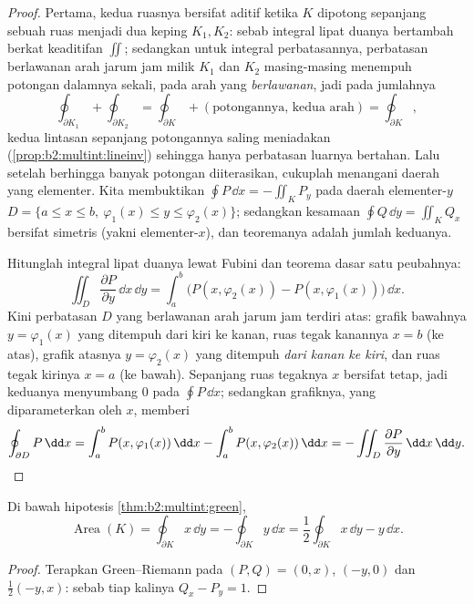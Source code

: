 \begin{proof}
Pertama, kedua ruasnya bersifat aditif ketika $K$ dipotong sepanjang sebuah
ruas menjadi dua keping $K_1, K_2$: sebab integral lipat duanya bertambah
berkat keaditifan $\iint$; sedangkan untuk integral perbatasannya,
perbatasan berlawanan arah jarum jam milik $K_1$ dan $K_2$ masing-masing menempuh
potongan dalamnya sekali, pada arah yang \emph{berlawanan}, jadi pada
jumlahnya
\[
\oint_{\partial K_1} + \oint_{\partial K_2}
= \oint_{\partial K} + (\text{potongannya, kedua arah})
= \oint_{\partial K},
\]
kedua lintasan sepanjang potongannya saling meniadakan
(\cref{prop:b2:multint:lineinv}) sehingga hanya perbatasan luarnya
bertahan. Lalu setelah berhingga banyak potongan diiterasikan, cukuplah menangani
daerah yang elementer. Kita membuktikan $\oint P\,\dd x = -\iint_K P_y$ pada
daerah elementer-$y$ $D = \{a \leq x \leq b,\ \varphi_1(x) \leq y
\leq \varphi_2(x)\}$; sedangkan kesamaan $\oint Q\,\dd y = \iint_K Q_x$
bersifat simetris (yakni elementer-$x$), dan teoremanya adalah jumlah keduanya.

Hitunglah integral lipat duanya lewat Fubini dan teorema
dasar satu peubahnya:
\[
\iint_D \frac{\partial P}{\partial y}\,\dd x\,\dd y
= \int_a^b \bigl(P(x, \varphi_2(x)) - P(x, \varphi_1(x))\bigr)
\,\dd x .
\]
Kini perbatasan $D$ yang berlawanan arah jarum jam terdiri atas: grafik
bawahnya $y = \varphi_1(x)$ yang ditempuh dari kiri ke kanan, ruas
tegak kanannya $x = b$ (ke atas), grafik atasnya $y =
\varphi_2(x)$ yang ditempuh \emph{dari kanan ke kiri}, dan ruas tegak
kirinya $x = a$ (ke bawah). Sepanjang ruas tegaknya $x$ bersifat
tetap, jadi keduanya menyumbang $0$ pada $\oint P\,\dd x$; sedangkan grafiknya,
yang diparameterkan oleh $x$, memberi
\[
\oint_{\partial D} P\,\dd x
= \int_a^b P(x, \varphi_1(x))\,\dd x
- \int_a^b P(x, \varphi_2(x))\,\dd x
= -\iint_D \frac{\partial P}{\partial y}\,\dd x\,\dd y .
\qedhere
\]
\end{proof}

\begin{corollary}\label{cor:b2:multint:area}
Di bawah hipotesis \cref{thm:b2:multint:green},
\[
\operatorname{Area}(K)
= \oint_{\partial K} x\,\dd y
= -\oint_{\partial K} y\,\dd x
= \frac12\oint_{\partial K} x\,\dd y - y\,\dd x .
\]
\end{corollary}

\begin{proof}
Terapkan Green--Riemann pada $(P, Q) = (0, x)$, $(-y, 0)$ dan
$\frac12(-y, x)$: sebab tiap kalinya $Q_x - P_y = 1$.
\end{proof}

